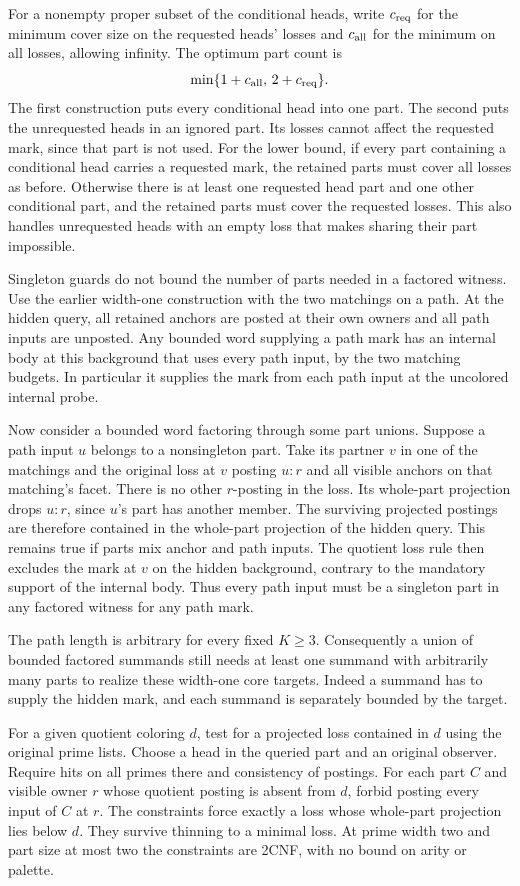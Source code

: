 For a nonempty proper subset of the conditional heads,
write $c_{\rm req}$ for the minimum cover size on the
requested heads' losses and $c_{\rm all}$ for the
minimum on all losses, allowing infinity. The optimum
part count is
\[
 \min\{1+c_{\rm all},\,2+c_{\rm req}\}.
\]
The first construction puts every conditional head into
one part. The second puts the unrequested heads in an
ignored part. Its losses cannot affect the requested
mark, since that part is not used. For the lower bound,
if every part containing a conditional head carries a
requested mark, the retained parts must cover all
losses as before. Otherwise there is at least one
requested head part and one other conditional part,
and the retained parts must cover the requested losses.
This also handles unrequested heads with an empty loss
that makes sharing their part impossible.

Singleton guards do not bound the number
of parts needed in a factored witness.
Use the earlier width-one construction
with the two matchings on a path.
At the hidden query, all retained anchors
are posted at their own owners and all
path inputs are unposted. Any bounded
word supplying a path mark has an
internal body at this background
that uses every path input, by the two
matching budgets. In particular it
supplies the mark from each path input
at the uncolored internal probe.

Now consider a bounded word factoring
through some part unions. Suppose a path
input $u$ belongs to a nonsingleton part.
Take its partner $v$ in one of the
matchings and the original loss at $v$
posting $u:r$ and all visible anchors on
that matching's facet. There is no other
$r$-posting in the loss. Its whole-part
projection drops $u:r$, since $u$'s part
has another member. The surviving
projected postings are therefore contained
in the whole-part projection of the
hidden query. This remains true if parts
mix anchor and path inputs. The quotient
loss rule then excludes the mark at
$v$ on the hidden background, contrary
to the mandatory support of the internal
body. Thus every path input must be a
singleton part in any factored witness
for any path mark.

The path length is arbitrary for every
fixed $K\geq3$. Consequently a union of
bounded factored summands still needs
at least one summand with arbitrarily
many parts to realize these width-one
core targets. Indeed a summand has to
supply the hidden mark, and each
summand is separately bounded by the
target.

For a given quotient coloring $d$,
test for a projected loss contained in
$d$ using the original prime lists.
Choose a head in the queried part and an
original observer. Require hits on all
primes there and consistency of postings.
For each part $C$ and visible owner $r$
whose quotient posting is absent from $d$,
forbid posting every input of $C$ at $r$.
The constraints force exactly a loss
whose whole-part projection lies below
$d$. They survive thinning to a minimal
loss. At prime width two and part size
at most two the constraints are 2CNF,
with no bound on arity or palette.

